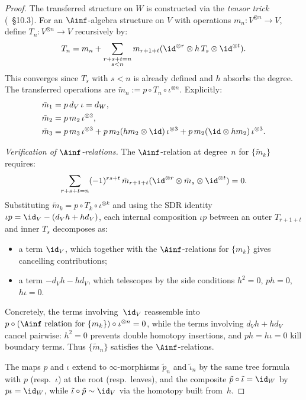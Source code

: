 \begin{proof}
The transferred structure on $W$ is constructed via the \emph{tensor trick}
(\cite{LV12}~\S10.3).
For an $\Ainf$-algebra structure on $V$ with operations $m_n: V^{\otimes n} \to V$,
define $T_n: V^{\otimes n} \to V$ recursively by:
\[
T_n = m_n + \sum_{\substack{r+s+t = n \\ s < n}} m_{r+1+t}(\id^{\otimes r} \otimes h\, T_s \otimes \id^{\otimes t}).
\]
This converges since $T_s$ with $s < n$ is already defined and $h$ absorbs
the degree. The transferred operations are $\tilde{m}_n := p \circ T_n \circ
\iota^{\otimes n}$. Explicitly:
\begin{align*}
\tilde{m}_1 &= p \, d_V \, \iota = d_W, \\
\tilde{m}_2 &= p \, m_2 \, \iota^{\otimes 2}, \\
\tilde{m}_3 &= p \, m_3 \, \iota^{\otimes 3} + p \, m_2 (h m_2 \otimes \id) \, \iota^{\otimes 3}
 + p \, m_2 (\id \otimes h m_2) \, \iota^{\otimes 3}.
\end{align*}

\emph{Verification of $\Ainf$-relations.}
The $\Ainf$-relation at degree~$n$ for $\{\tilde{m}_k\}$ requires:
\begin{equation}\label{eq:ainfty-relation}
\sum_{\substack{r+s+t=n}} (-1)^{rs+t}\, \tilde{m}_{r+1+t}(\id^{\otimes r} \otimes \tilde{m}_s \otimes \id^{\otimes t}) = 0.
\end{equation}
Substituting $\tilde{m}_k = p \circ T_k \circ \iota^{\otimes k}$ and using the
SDR identity $\iota p = \id_V - (d_V h + h d_V)$, each internal composition
$\iota p$ between an outer $T_{r+1+t}$ and inner $T_s$ decomposes as:
\begin{itemize}
\item a term $\id_V$, which together with the $\Ainf$-relations for $\{m_k\}$
 gives cancelling contributions;
\item a term $-d_V h - h d_V$, which telescopes by the side conditions
 $h^2 = 0$, $p h = 0$, $h \iota = 0$.
\end{itemize}
Concretely, the terms involving~$\id_V$ reassemble into $p \circ (\text{$\Ainf$
relation for } \{m_k\}) \circ \iota^{\otimes n} = 0$, while the terms
involving $d_V h + h d_V$ cancel pairwise: $h^2 = 0$ prevents double
homotopy insertions, and $ph = h\iota = 0$ kill boundary terms. Thus
$\{\tilde{m}_n\}$ satisfies the $\Ainf$-relations.

The maps $p$ and $\iota$ extend to $\infty$-morphisms $\tilde{p}_n$ and
$\tilde{\iota}_n$ by the same tree formula with $p$ (resp.~$\iota$) at
the root (resp.~leaves), and the composite $\tilde{p} \circ \tilde{\iota}
= \id_W$ by $p\iota = \id_W$, while $\tilde{\iota} \circ \tilde{p}
\sim \id_V$ via the homotopy built from~$h$.
\end{proof}

